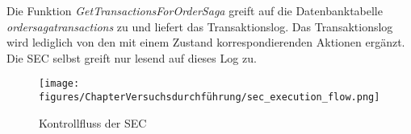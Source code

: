 Die Funktion \textit{GetTransactionsForOrderSaga} greift auf die Datenbanktabelle \textit{ordersagatransactions} zu und liefert das Transaktionslog. Das Transaktionslog wird lediglich von den mit einem Zustand korrespondierenden Aktionen ergänzt. Die SEC selbst greift nur lesend auf dieses Log zu.

\begin{figure}[H]
	\centering
	\texttt{[image: figures/ChapterVersuchsdurchführung/sec\_execution\_flow.png]}
	\caption{Kontrollfluss der SEC}
	\label{sequence_diagramm_sec_control_flow}
\end{figure}
\FloatBarrier
